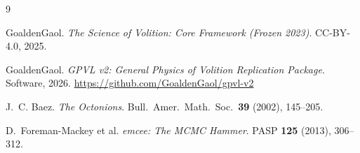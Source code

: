 \begin{thebibliography}{9}

GoaldenGaol.
\textit{The Science of Volition: Core Framework (Frozen 2023)}.
CC-BY-4.0, 2025.

GoaldenGaol.
\textit{GPVL v2: General Physics of Volition Replication Package}.
Software, 2026. \url{https://github.com/GoaldenGaol/gpvl-v2}

J.~C. Baez.
\textit{The Octonions}.
Bull.\ Amer.\ Math.\ Soc.\ \textbf{39} (2002), 145--205.

D.~Foreman-Mackey et al.
\textit{emcee: The MCMC Hammer}.
PASP \textbf{125} (2013), 306--312.

\end{thebibliography}
